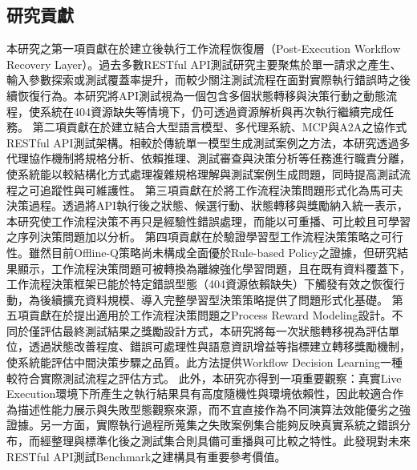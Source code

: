 \begin{ZhChapter}
\subsection{研究貢獻}
\text 本研究之第一項貢獻在於建立後執行工作流程恢復層（Post-Execution Workflow Recovery Layer）。過去多數RESTful API測試研究主要聚焦於單一請求之產生、輸入參數探索或測試覆蓋率提升，而較少關注測試流程在面對實際執行錯誤時之後續恢復行為。本研究將API測試視為一個包含多個狀態轉移與決策行動之動態流程，使系統在404資源缺失等情境下，仍可透過資源解析與再次執行繼續完成任務。
\text 第二項貢獻在於建立結合大型語言模型、多代理系統、MCP與A2A之協作式RESTful API測試架構。相較於傳統單一模型生成測試案例之方法，本研究透過多代理協作機制將規格分析、依賴推理、測試審查與決策分析等任務進行職責分離，使系統能以較結構化方式處理複雜規格理解與測試案例生成問題，同時提高測試流程之可追蹤性與可維護性。
\text 第三項貢獻在於將工作流程決策問題形式化為馬可夫決策過程。透過將API執行後之狀態、候選行動、狀態轉移與獎勵納入統一表示，本研究使工作流程決策不再只是經驗性錯誤處理，而能以可重播、可比較且可學習之序列決策問題加以分析。
\text 第四項貢獻在於驗證學習型工作流程決策策略之可行性。雖然目前Offline-Q策略尚未構成全面優於Rule-based Policy之證據，但研究結果顯示，工作流程決策問題可被轉換為離線強化學習問題，且在既有資料覆蓋下，工作流程決策框架已能於特定錯誤型態（404資源依賴缺失）下觸發有效之恢復行動，為後續擴充資料規模、導入完整學習型決策策略提供了問題形式化基礎。
\text 第五項貢獻在於提出適用於工作流程決策問題之Process Reward Modeling設計。不同於僅評估最終測試結果之獎勵設計方式，本研究將每一次狀態轉移視為評估單位，透過狀態改善程度、錯誤可處理性與語意資訊增益等指標建立轉移獎勵機制，使系統能評估中間決策步驟之品質。此方法提供Workflow Decision Learning一種較符合實際測試流程之評估方式。
\text 此外，本研究亦得到一項重要觀察：真實Live Execution環境下所產生之執行結果具有高度隨機性與環境依賴性，因此較適合作為描述性能力展示與失敗型態觀察來源，而不宜直接作為不同演算法效能優劣之強證據。另一方面，實際執行過程所蒐集之失敗案例集合能夠反映真實系統之錯誤分布，而經整理與標準化後之測試集合則具備可重播與可比較之特性。此發現對未來RESTful API測試Benchmark之建構具有重要參考價值。


\end{ZhChapter}
